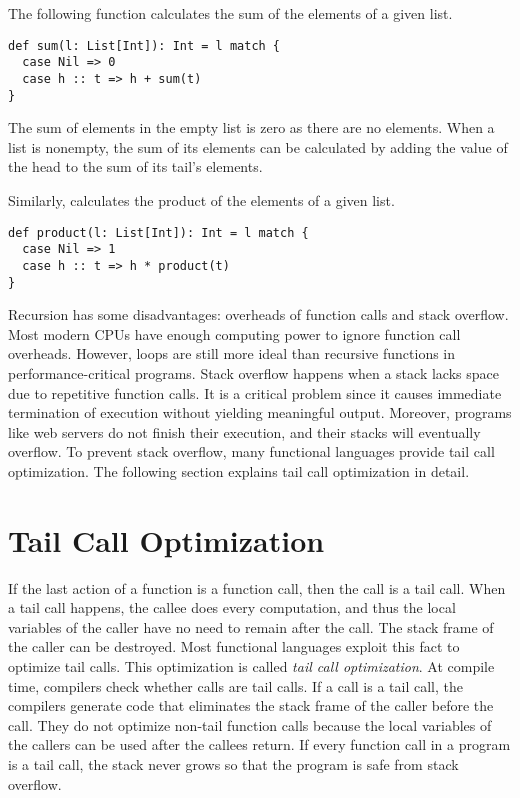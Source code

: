 The following function calculates the sum of the elements of a given list.

\begin{verbatim}
def sum(l: List[Int]): Int = l match {
  case Nil => 0
  case h :: t => h + sum(t)
}
\end{verbatim}

The sum of elements in the empty list is zero as there are no elements.
When a list is nonempty, the sum of its elements can be calculated by adding the
value of the head to the sum of its tail's elements.

Similarly,  calculates the product of the elements of a given
list.

\begin{verbatim}
def product(l: List[Int]): Int = l match {
  case Nil => 1
  case h :: t => h * product(t)
}
\end{verbatim}

Recursion has some disadvantages: overheads of function calls and stack
overflow. Most modern CPUs have enough computing power to ignore function call
overheads. However, loops are still more ideal than recursive functions in
performance-critical programs. Stack overflow happens when a
stack lacks space due to repetitive function calls. It is a critical problem
since it causes immediate termination of execution without yielding meaningful
output. Moreover, programs like web servers do not finish their execution, and
their stacks will eventually overflow. To prevent stack overflow, many functional
languages provide tail call optimization.
The following section explains tail call optimization in detail.

\section{Tail Call Optimization}

If the last action of a function is a function call, then the call is a tail
call. When a tail call happens, the callee does every computation, and thus the
local variables of the caller have no need to remain after the call. The stack
frame of the caller can be destroyed. Most functional languages exploit this
fact to optimize tail calls. This optimization is called
\textit{tail call optimization}.
At compile time, compilers check whether calls are tail calls.
If a call is a tail call, the compilers generate code that eliminates the
stack frame of the caller before the call. They do not optimize non-tail function
calls because the local variables of the callers can be used after the callees
return. If every function call in a program is a tail call, the stack never
grows so that the program is safe from stack overflow.

